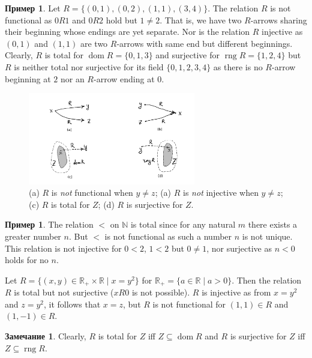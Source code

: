 \documentclass[12pt,notitlepage]{article}
\theoremstyle{plain}
\theoremstyle{definition}
\newtheorem{exm}[thm]{Пример}
\newtheorem{rem}[thm]{Замечание}
\theoremstyle{plain}
\newcommand{\N}{\mathbb{N}}
\newcommand{\R}{\mathbb{R}}
\newcommand{\sbs}{\subseteq}
\newcommand{\dom}{\mathop{\mathrm{dom}}}
\newcommand{\rng}{\mathop{\mathrm{rng}}}
\newcommand{\1}{\mathbf{1}}
\newcommand{\0}{\mathbf{0}}
\begin{document}
\begin{exm}
	Let $R = \{(0,1), (0,2), (1,1), (3,4)\}$. The relation $R$ is not functional as $0 R 1$ and $0 R 2$ hold but $1 \neq 2$. That is, we have two $R$-arrows sharing their beginning whose endings are yet separate. Nor is the relation $R$ injective as $(0, 1)$ and $(1, 1)$ are two $R$-arrows with same end but different beginnings. Clearly, $R$ is total for $\dom R = \{0,1,3\}$ and surjective for $\rng R = \{1,2,4\}$ but $R$ is neither total nor surjective for its field $\{0,1,2,3,4\}$ as there is no $R$-arrow beginning at $2$ nor an $R$-arrow ending at $0$.
\end{exm}

\begin{figure}[h]
	\centering
	\includegraphics*[width=0.65\textwidth]{func_etc.pdf}
	\caption{(a) $R$ is \emph{not} functional when $y \neq z$; (a) $R$ is \emph{not} injective when $y \neq z$; (c) $R$ is total for $Z$; (d) $R$ is surjective for $Z$.}
\end{figure}


\begin{exm}
	The relation ${<}$ on $\N$ is total since for any natural $m$ there exists a greater number $n$. But ${<}$ is not functional as such a number $n$ is not unique. This relation is not injective for $0 < 2$, $1 < 2$ but $0 \neq 1$, nor surjective as $n < 0$ holds for no $n$. 
	
	Let $R = \{(x,y) \in \R_{+} \times \R \mid x = y^2 \}$ for $\R_+ = \{a \in \R  \mid a > 0\}$. Then the relation $R$ is total but not surjective ($xR0$ is not possible). $R$ is injective as from $x = y^2$ and $z = y^2$, it follows that $x = z$, but $R$ is not functional for $(1, 1) \in R$ and $(1, -1) \in R$.
\end{exm}

\begin{rem}
	Clearly, $R$ is total for $Z$ iff $Z \sbs \dom R$ and $R$ is surjective for $Z$ iff $Z \sbs \rng R$.
\end{rem}
\end{document}
